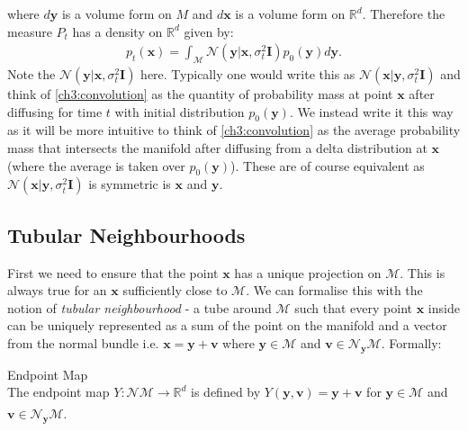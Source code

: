 where $d\textbf{y}$ is a volume form on $M$ and $d\textbf{x}$ is a volume form on $\mathbb{R}^d$.
Therefore the measure $P_t$ has a density on $\mathbb{R}^d$ given by:
\begin{gather}
    \label{ch3:convolution}
    p_t(\textbf{x}) = \int_\mathcal{M} \mathcal{N}(\textbf{y} | \textbf{x}, \sigma^2_t\textbf{I}) p_0(\textbf{y}) d\textbf{y}.
\end{gather}
Note the $\mathcal{N}(\textbf{y}|\textbf{x},\sigma^2_t\textbf{I})$ here. Typically one would write this as $\mathcal{N}(\textbf{x}|\textbf{y},\sigma^2_t\textbf{I})$ and think of \eqref{ch3:convolution} as the quantity of probability mass at point $\textbf{x}$ after diffusing for time $t$ with initial distribution $p_0(\textbf{y})$. We instead write it this way as it will be more intuitive to think of \eqref{ch3:convolution} as the average probability mass that intersects the manifold after diffusing from a delta distribution at $\textbf{x}$ (where the average is taken over $p_0(\textbf{y})$). These are of course equivalent as $\mathcal{N}(\textbf{x}|\textbf{y},\sigma^2_t\textbf{I})$ is symmetric is $\textbf{x}$ and $\textbf{y}$.

\subsection*{Tubular Neighbourhoods}
First we need to ensure that the point $\textbf{x}$ has a unique projection on $\mathcal{M}$. This is always true for an $\textbf{x}$ sufficiently close to $\mathcal{M}$. We can formalise this with the notion of \textit{tubular neighbourhood} - a tube around $\mathcal{M}$ such that every point $\textbf{x}$ inside can be uniquely represented as a sum of the point on the manifold and a vector from the normal bundle i.e. $\textbf{x} = \textbf{y} + \textbf{v}$ where $\textbf{y} \in \mathcal{M}$ and $\textbf{v} \in \mathcal{N}_\textbf{y} \mathcal{M}$. Formally:

\begin{definition}
Endpoint Map\\
The endpoint map $Y: \mathcal{NM} \xrightarrow[]{} \mathbb{R}^d$ is defined by $Y(\textbf{y}, \textbf{v}) = \textbf{y} + \textbf{v}$ for $\textbf{y} \in \mathcal{M}$ and $\textbf{v} \in \mathcal{N}_\textbf{y} \mathcal{M}$. 
\end{definition}

